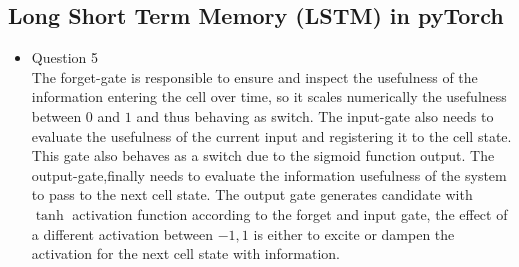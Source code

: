 \documentclass{article}
\begin{document}
\subsection{Long Short Term Memory (LSTM) in pyTorch}
\begin{itemize}
  \item Question 5 \\
  The forget-gate is responsible to ensure and inspect the usefulness of the information entering the cell over time, so it scales numerically the usefulness between $0$ and $1$ and thus behaving as switch. 
  The input-gate also needs to evaluate the usefulness of the current input and registering it to the cell state. This gate also behaves as a switch due to the sigmoid function output. The output-gate,finally needs to evaluate the information usefulness of the system to pass to the next cell state.  The output gate generates candidate with $\tanh$ activation function according to the forget and input gate, the effect of a different activation between $-1, 1$ is either to excite or dampen the activation for the next cell state with information. 


\end{itemize}
\end{document}

